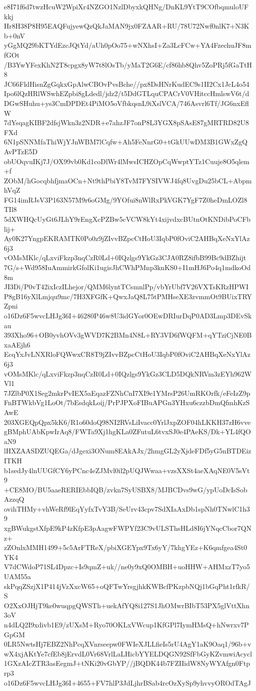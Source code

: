 e8I71f6d7twzHcuW2WpiXr4NZGO1NzlDbyxkQHNg/DnKL9YtT9COfbqmuloUFkkj
Hr8H38P8H95EAQFujyewQzQkJaMAN9jx0FZAAR+RU/78U72Nwf0nlK7+N3Kb+0nV
yGgMQ29bKTYdEzcJQtYd/aUh0pOo75+wNXhsI+Za3LcFCw+YA4FzechuJF8mfGOt
/B3YwYFexKhN2T8cpgx8yW7t8lOsTb/yMaT2G6E/cf86hb8Qhv5ZoPRj5fGaTtH8
JC66FldHisnZgGqkxGpAlwCBOvPvsBche//px8DsHNrKudEC9s1II2Cx1JcL4o54
Ipo6lQzHRlWSwhEZpbi8gLdedl/jdz2/t5DdGTLquCPACrV0VHitccHmlswV6t/d
DGwSHuhu+ys3CmDPDEt4PiMO5oVfbkqsnL9iXslVCA/746Asvrl6Tf/JG6nxEflW
7dYsqagKIBF2dfsjWkn3z2NDR+e7ahzJF7onP8L3YGX8pSAsE87gMRTRD82U8FXd
6N1pSNNMfaThiWjYJnWBM7lCqfw+Ah5FeNnrG0+tGkUUwDM3B1GWxZgQAvPTzE5D
obUOqvuIKj7J/OX99vb0Kd1coDlWr4lMwsICHZOpCqWwptYTz1Cuuje8O5qlem+f
ZObM/hGocqbhfjmaOCn+Nt9thPbiY8TvM7FYSIVWJ4fq8UvgDu25bCL+AbpmhVqZ
FG14imRJsV3P163N57M9r6oGMg/9YOfui8nWlRxPkVGK7YgF7Z0heDmLOZl8TIl8
5dXWHQcUyGt6JLhY9rEngXcPZBw5cVCW8kYt4xijvdxcBUtnOtKNDibPoCFblij+
Ay0K27YngpEKRAMTK0Po0z9jZIvvBZpcCtHoU3IqbP0fOviC2AHBqXeNxYlAz6j3
vOMsMKlc/qLxviFkzp3nqCzR0Ld+0IQzlgs9YkGz3CJA0RZ8ifbB99Bc9dBZhijt
7G/s+Wd958IuAmmirkGfolKi1ugisJhCWhPMnp3knKS0+I1mHJ6Po4q1mdkoOd8m
JI3Di/P0vT42ixIczILhejor/QMM6lyntTCsmnlPp/vbYrUbf7V26VXTsKRzHPWI
P8gB16yXlLmjqu9mc/7H3XFGfK+QwxJaQ8L75tPMHseXE3zvmmOt9BUixTRYZpni
o16Dz6F5wvcLHJg36I+46280P46w8U3idGYor0OEwDRIurDqP0AD3Lmp3DEvSkau
393Xho96+OB0yvhOVv3gWVD7K2BMn4N8L+RY3VD6fWQFM+qYTziCjNE0BxaAEjh6
EcqYxJvLNXRloFQWwxCR8T9jZIvvBZpcCtHoU3IqbP0fOviC2AHBqXeNxYlAz6j3
vOMsMKlc/qLxviFkzp3nqCzR0Ld+0IQzlgs9YkGz3CLD5DQkNRVm3zEYh962WVl1
7JZlbP0X1Seg2mkrPvIEX5aEqazFZNhCnI7XI9e1YMrsP26UmRKOrfk/eFeIzZ9p
FnBTWkbVg1LoOt/7bEsdqkLoij/PrPJPXoFIBuAPGn3YHxu6czzbDmQfmhKzSAwE
203XGEQpQpx5kK6/R1o60doQ98NI2RVsLiIvacc0YrlJxpZOF04hLKKH37zH6vve
gBMphUAbKpwIrAq8/FWTa9Xj1hgKLa0ZFutuL6tvxSJ0e4PAeKS/Dk+YL4fQOaN9
lHXZAASDZUQEGa/dJgexi3ONum8EAkAJx/2hmgGL2yXjdeFDf5yG5nBTDEizITKH
b1sedJy4lnUUGfCY6yPCnc4eZJMvl0il2pUQJWwaa+vzsXXSt4aeXAqNE0V5sVt9
+CE8MO/BU5aaeRERIEbbIQB/zvkn7SyUSBX8/MJBCDvs9wG/ypUoDcIsSobAzzqQ
ovihTHMy+vhWeRf9lEqYyfxTvY3B/SeUrv43cpv7SdXIaAxDb1spNh0TNwlC1h39
xgBWukgstXfpE9kP4zKfpE3pAagwFWPYf23C9vULSThsHLd8I6jYNqcCbor7QNz+
zZOnlxMMH1499+5c5ArFTReX/pbiXGEYpx9Tx6yY/7khgYEz+K6qmfgea4St0YK4
V7dCWdoP71SL4Dpzc+Is9qmZ+uk//ne0y9xQ0OMBH+uoHHW+AHMxzT7yo5UAM55a
skPqqZSzjX1P414jVzXxcW65+oQFTwYrsgjhkKWBcfPKzpbNQj1bGqPht1rfkR/S
O2XxOJHjT9ke0wuqpgQWSTh+uekAfYQ8i127S1JhOMwrBIbT53PX5glVttXhn3oV
n4dLQ2I9xdivb1E9/zUXsM+Ryo70OKLxVWcup1KfGPl7IymHMsQ+hNwrxv7PGpGM
0LR5NwtsHj7EBZ2NhPcqXVnrseepw0FWIeXJLLfieIs5rU4AgY1aK9Oaq1/96b+v
wX4xjAKtYe7cfEb8jErvdL0Vr68VrlLaLHicbYYELDQGN92SfFbGyKZvmwiAcycl
1GXzAIcZTR3asEegmJ+tNKi20vGbYP//jBQDK44b7FZIIidW8NyWYAfgn0Ftprp3
o16Dz6F5wvcLHJg36I+4655+FV7hlP3JdLjhrBSab4rcOzXySp9yhvvyOROdTAgJ
